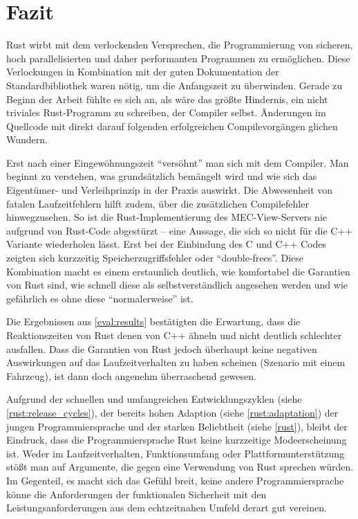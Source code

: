 \chapter{Fazit}


Rust wirbt mit dem verlockenden Versprechen, die Programmierung von sicheren, hoch parallelisierten und daher performanten Programmen zu ermöglichen.
Diese Verlockungen in Kombination mit der guten Dokumentation der Standardbibliothek waren nötig, um die Anfangszeit zu überwinden.
Gerade zu Beginn der Arbeit fühlte es sich an, als wäre das größte Hindernis, ein nicht triviales Rust-Programm zu schreiben, der Compiler selbst.
Änderungen im Quellcode mit direkt darauf folgenden erfolgreichen Compilevorgängen glichen Wundern.

Erst nach einer Eingewöhnungszeit \enquote{versöhnt} man sich mit dem Compiler.
Man beginnt zu verstehen, was grundsätzlich bemängelt wird und wie sich das Eigentümer- und Verleihprinzip in der Praxis auswirkt.
Die Abwesenheit von fatalen Laufzeitfehlern hilft zudem, über die zusätzlichen Compilefehler hinwegzusehen.
So ist die Rust-Implementierung des MEC-View-Servers nie aufgrund von Rust-Code abgestürzt -- eine Aussage, die sich so nicht für die C++ Variante wiederholen lässt.
Erst bei der Einbindung des C und C++ Codes zeigten sich kurzzeitig Speicherzugriffsfehler oder \enquote{double-frees}.
Diese Kombination macht es einem erstaunlich deutlich, wie komfortabel die Garantien von Rust sind, wie schnell diese als selbstverständlich angesehen werden und wie gefährlich es ohne diese \enquote{normalerweise} ist.

Die Ergebnissen aus \autoref{eval:results} bestätigten die Erwartung, dass die Reaktionszeiten von Rust denen von C++ ähneln und nicht deutlich schlechter ausfallen.
Dass die Garantien von Rust jedoch überhaupt keine negativen Auswirkungen auf das Laufzeitverhalten zu haben scheinen (Szenario mit einem Fahrzeug), ist  dann doch angenehm überraschend gewesen.

Aufgrund der schnellen und umfangreichen Entwicklungszyklen (siehe \autoref{rust:release_cycles}), der bereits hohen Adaption (siehe \autoref{rust:adaptation}) der jungen Programmiersprache und der starken Beliebtheit (siehe \autoref{rust}), bleibt der Eindruck, dass die Programmiersprache Rust keine kurzzeitige Modeerscheinung ist.
Weder im Laufzeitverhalten, Funktionsumfang oder Plattformunterstützung stößt man auf Argumente, die gegen eine Verwendung von Rust sprechen würden.
Im Gegenteil, es macht sich das Gefühl breit, keine andere Programmiersprache könne die Anforderungen der funktionalen Sicherheit mit den Leistungsanforderungen aus dem echtzeitnahen Umfeld derart gut vereinen.

